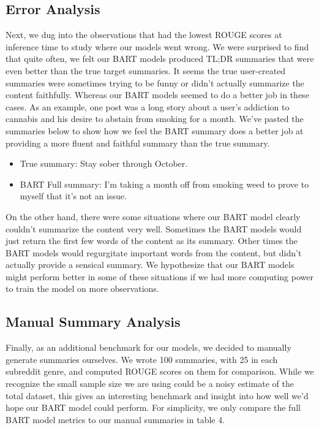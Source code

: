 \documentclass[11pt,a4paper, twocolumn]{article}
\begin{document}
\subsection{Error Analysis}

Next, we dug into the observations that had the lowest ROUGE scores at inference time to study where our models went wrong. 
We were surprised to find that quite often, we felt our BART models produced TL;DR summaries that were even better than the true target summaries. 
It seems the true user-created summaries were sometimes trying to be funny or didn't actually summarize the content faithfully. 
Whereas our BART models seemed to do a better job in these cases. 
As an example, one post was a long story about a user's addiction to cannabis and his desire to abstain from smoking for a month. 
We've pasted the summaries below to show how we feel the BART summary does a better job at providing a more fluent and faithful summary than the true summary. 

\begin{itemize}
  \item True summary: Stay sober through October.
  \item BART Full summary: I'm taking a month off from smoking weed to prove to myself that it's not an issue.
\end{itemize}

On the other hand, there were some situations where our BART model clearly couldn't summarize the content very well. 
Sometimes the BART models would just return the first few words of the content as its summary. 
Other times the BART models would regurgitate important words from the content, but didn't actually provide a sensical summary. 
We hypothesize that our BART models might perform better in some of these situations if we had more computing power to train the model on more observations. 

\subsection{Manual Summary Analysis}

Finally, as an additional benchmark for our models, we decided to manually generate summaries ourselves. 
We wrote 100 summaries, with 25 in each subreddit genre, and computed ROUGE scores on them for comparison. 
While we recognize the small sample size we are using could be a noisy estimate of the total dataset, 
this gives an interesting benchmark and insight into how well we'd hope our BART model could perform.
For simplicity, we only compare the full BART model metrics to our manual summaries in table 4. 
\end{document}
